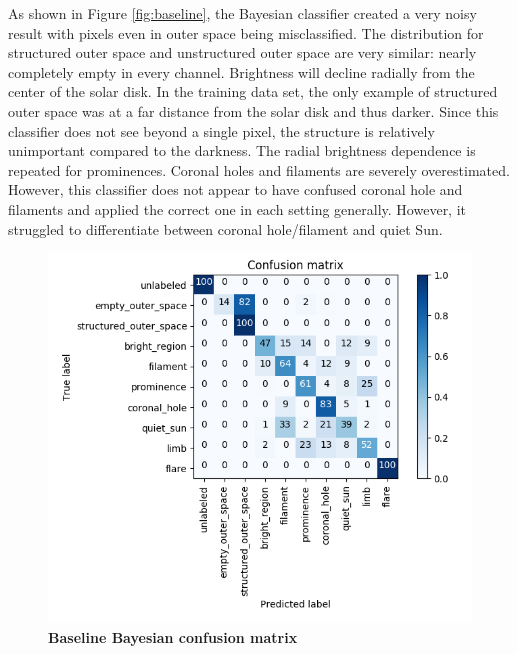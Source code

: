 \documentclass[twoside]{report}
\begin{document}
As shown in Figure \ref{fig:baseline}, the Bayesian classifier created a very noisy result with pixels even in outer space being misclassified. The distribution for structured outer space and unstructured outer space are very similar: nearly completely empty in every channel. Brightness will decline radially from the center of the solar disk. In the training data set, the only example of structured outer space was at a far distance from the solar disk and thus darker. Since this classifier does not see beyond a single pixel, the structure is relatively unimportant compared to the darkness. The radial brightness dependence is repeated for prominences. Coronal holes and filaments are severely overestimated. However, this classifier does not appear to have confused coronal hole and filaments and applied the correct one in each setting generally. However, it struggled to differentiate between coronal hole/filament and quiet Sun.  

\begin{figure}[ht]
  \begin{center}
    \includegraphics[scale=0.8]{base_bayesian_conf}
    \caption{{\bf Baseline Bayesian confusion matrix}}
    \label{fig:base-bay-conf}
 \end{center}
\end{figure}
\end{document}

